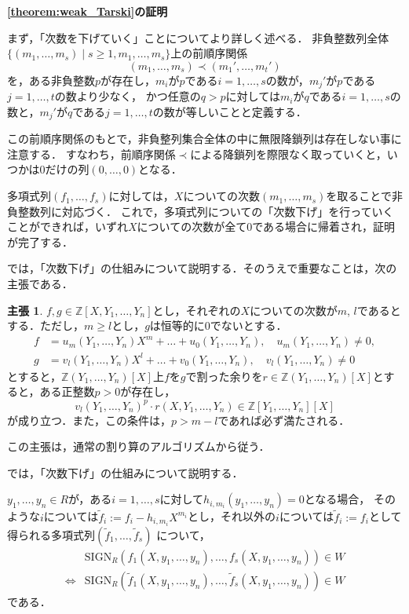 \documentclass[uplatex, dvipdfmx]{jsarticle}
\makeatletter
\numberwithin{equation}{section}
\renewenvironment{proof}[1][\proofname]{\par
  \pushQED{\qed}%
  \normalfont \topsep6\p@\@plus6\p@\relax
  \trivlist
  \item\relax
  {\bfseries
  #1\@addpunct{.}}\hspace\labelsep\ignorespaces
}{
  \popQED\endtrivlist\@endpefalse
}
\newcommand{\Z}{\mathbb{Z}}
\newcommand{\SIGN}{\mathrm{SIGN}}
\theoremstyle{definition}
\newtheorem*{claim*}{主張}
\renewcommand{\proofname}{\textbf{証明}}
\makeatother
\begin{document}
\begin{proof}[\cref{theorem:weak_Tarski}の証明]
     まず，「次数を下げていく」ことについてより詳しく述べる．
     非負整数列全体$\{(m_1, \dots, m_s) \mid s \geq 1, m_1, \dots, m_s\}$上の前順序関係
     \begin{equation}
          (m_1, \dots, m_s) \prec (m_1', \dots, m_t')
     \end{equation}
     を，ある非負整数$p$が存在し，$m_i$が$p$である$i=1, \dots, s$の数が，$m_j'$が$p$である$j=1, \dots, t$の数より少なく，
     かつ任意の$q>p$に対しては$m_i$が$q$である$i=1, \dots, s$の数と，$m_j'$が$q$である$j=1, \dots, t$の数が等しいことと定義する．

     この前順序関係のもとで，非負整列集合全体の中に無限降鎖列は存在しない事に注意する．
     すなわち，前順序関係$\prec$による降鎖列を際限なく取っていくと，いつかは$0$だけの列$(0,\dots, 0)$となる．

     多項式列$(f_1, \dots, f_s)$に対しては，$X$についての次数$(m_1, \dots, m_s)$を取ることで非負整数列に対応づく．
     これで，多項式列についての「次数下げ」を行っていくことができれば，いずれ$X$についての次数が全て$0$である場合に帰着され，証明が完了する．

     では，「次数下げ」の仕組みについて説明する．そのうえで重要なことは，次の主張である．  
     \begin{claim*}
          $ f , g \in \Z[X, Y_1, \dots, Y_n]$とし，それぞれの$X$についての次数が$m$, $l$であるとする．ただし，$m \geq l$とし，$g$は恒等的に$0$でないとする．
          \begin{align}
               f &= u_m(Y_1, \dots, Y_n)X^m + \dots + u_0(Y_1, \dots, Y_n), \quad u_m(Y_1, \dots, Y_n) \neq 0, \\
               g &= v_l(Y_1, \dots, Y_n)X^l + \dots + v_0(Y_1, \dots, Y_n), \quad v_l(Y_1, \dots, Y_n) \neq 0
          \end{align}
          とすると，$\Z(Y_1, \dots, Y_n)[X]$上$f$を$g$で割った余りを$r \in \Z(Y_1, \dots, Y_n)[X]$とすると，ある正整数$p>0$が存在し，
          \begin{equation}
               v_l(Y_1, \dots, Y_n)^p \cdot r(X,Y_1, \dots, Y_n) \in \Z[Y_1, \dots, Y_n][X]
          \end{equation}
          が成り立つ．また，この条件は，$p>m-l$であれば必ず満たされる．
     \end{claim*}
     この主張は，通常の割り算のアルゴリズムから従う．

     では，「次数下げ」の仕組みについて説明する．

     $y_1, \dots, y_n \in R$が，ある$i=1, \dots, s$に対して$h_{i, m_i}(y_1, \dots, y_n) = 0$となる場合，
     そのような$i$については$\tilde{f}_i := f_i - h_{i, m_i}X^{m_i}$とし，それ以外の$i$については$\tilde{f}_i := f_i$として得られる多項式列$(\tilde{f}_1, \dots, \tilde{f}_s)$
     について，
     \begin{align}
          &\SIGN_R(f_1(X,y_1, \dots, y_n), \dots, f_s(X,y_1, \dots, y_n)) \in W\\
          \iff &\SIGN_R(\tilde{f}_1(X,y_1, \dots, y_n), \dots, \tilde{f}_s(X,y_1, \dots, y_n)) \in W
     \end{align}
     である．


\end{proof}
\end{document}
